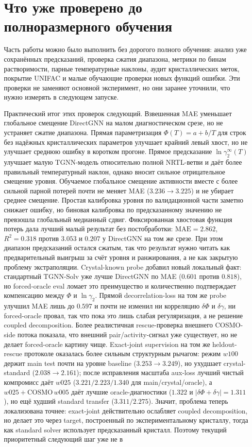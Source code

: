 \documentclass[11pt]{article}
\newcommand{\mae}{\mathrm{MAE}}
\newcommand{\Rtwo}{R^2}
\newcommand{\abs}[1]{\left\lvert #1 \right\rvert}
\theoremstyle{definition}
\begin{document}
\section{Что уже проверено до полноразмерного обучения}

Часть работы можно было выполнить без дорогого полного обучения: анализ уже сохранённых предсказаний, проверка сжатия диапазона, метрики по бинам растворимости, парные температурные наклоны, аудит кристаллических меток, покрытие UNIFAC и малые обучающие проверки новых функций ошибки. Эти проверки не заменяют основной эксперимент, но они заранее уточнили, что нужно измерять в следующем запуске.

Практический итог этих проверок следующий. Взвешенная MAE уменьшает глобальное смещение DirectGNN на малом диагностическом срезе, но не устраняет сжатие диапазона. Прямая параметризация $\Phi(T)=a+b/T$ для строк без надёжных кристаллических параметров улучшает крайний левый хвост, но не улучшает среднюю ошибку в коротком прогоне. Прямое предсказание $\ln\gamma_2^\infty(T)$ улучшает малую TGNN-модель относительно полной NRTL-ветви и даёт более правильный температурный наклон, однако вносит сильное отрицательное смещение уровня. Обучаемое глобальное смещение активности вместе с более сильной парной потерей почти не меняет MAE ($3.236\to3.225$) и не убирает среднее смещение. Простая калибровка уровня по валидационной части заметно снижает ошибку, но биновая калибровка по предсказанному значению не превзошла глобальный медианный сдвиг. Фиксированная хвостовая функция потерь дала лучший малый результат без постобработки: $\mae=2.862$, $\Rtwo=0.318$ против $3.053$ и $0.207$ у DirectGNN на том же срезе. При этом диапазон предсказаний остался сжатым, так что результат нужно читать как предварительный выигрыш за счёт уровня и ранжирования, а не как закрытую проблему экстраполяции. Crystal-known probe добавил новый локальный факт: стандартный TGNN-Solv уже лучше DirectGNN по MAE ($0.601$ против $0.818$), но forced-oracle eval ломает это преимущество и количественно подтверждает компенсацию между $\Phi$ и $\ln\gamma_2$. Прямой decorrelation-loss на том же probe улучшил MAE лишь до $0.597$ и почти не изменил ни корреляцию $\delta\Phi$ и $\delta\gamma$, ни forced-oracle провал, так что пока это лишь слабая регуляризация, а не решение coupled decomposition. Более реалистичная rescue-проверка внешнего COSMO-side потока показала, что внешний pair/activity-сигнал уже существует, но не делает forced-oracle картину чище. Exact-joint supervision на том же heldout-rescue протоколе оказалась более сильным структурным рычагом: режим $w100$ держит main test почти на уровне baseline ($3.253\to3.249$), но ухудшает crystal-standard ($2.038\to2.161$); после исправления масштаба aux-loss лучший чистый компромисс даёт $w025$ ($3.221/2.223/1.340$ для main/crystal/oracle), а $w025+\mathrm{COSMO}\,w005$ даёт лучшие oracle-диагностики ($1.322$ и $\abs{\delta\Phi+\delta\gamma}=1.311$), но ещё худший standard transfer ($3.311/2.275$). Значит, проблема теперь локализована точнее: exact-joint действительно ослабляет coupled decomposition, но делает это через target, построенный по экспериментальному кристаллу, тогда как standard solver использует предсказанный кристалл. Поэтому текущий приоритетный следующий шаг уже не в 
\end{document}

